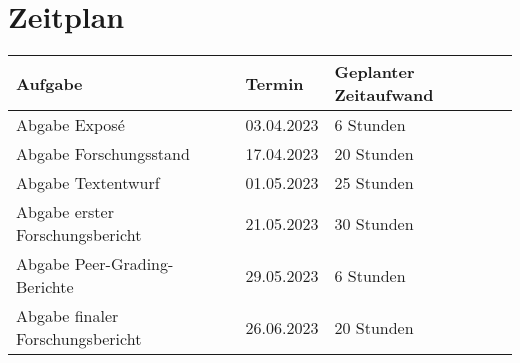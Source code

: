 \documentclass[12pt]{article}
\begin{document}
\section{Zeitplan}
\begin{center}
    \begin{tabular}{ |l|l|l| } 
     \hline
     Aufgabe & Termin & Geplanter Zeitaufwand \\ 
     \hline
     Abgabe Exposé & 03.04.2023 & 6 Stunden \\ 
     \hline
     Abgabe Forschungsstand & 17.04.2023 & 20 Stunden \\ 
     \hline
     Abgabe Textentwurf & 01.05.2023 & 25 Stunden \\ 
     \hline
     Abgabe erster Forschungsbericht & 21.05.2023 & 30 Stunden \\ 
     \hline
     Abgabe Peer-Grading-Berichte & 29.05.2023 & 6 Stunden \\ 
     \hline
     Abgabe finaler Forschungsbericht & 26.06.2023 & 20 Stunden \\ 
     \hline
    \end{tabular}
    \end{center}
\end{document}
